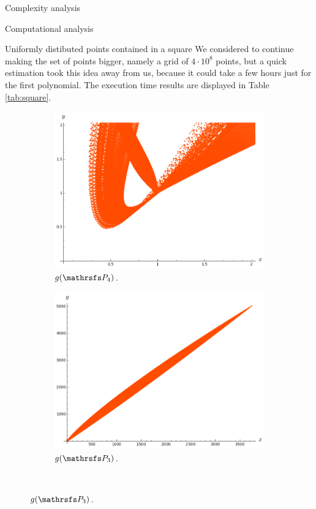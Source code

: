 \documentclass[11pt, a4paper, english, twoside, notitlepage, openright]{report}
\begin{document}
\begin{chapter}{Complexity analysis}
\begin{section}{Computational analysis}
\begin{subsection}{Uniformly distibuted points contained in a square}
We considered to continue making the set of points bigger, namely a grid of $4\cdot 10^8$ points, but a quick estimation took this idea away from us, because it could take a few hours just for the first polynomial. The execution time results are displayed in Table \ref{tab:square}.

\begin{figure}[ht!]
\hspace{0.1cm}
\begin{subfigure}{.49\linewidth}\centering
\includegraphics[width=1\textwidth]{plots/ch5_08_P4prime.png}
\vspace{-0.4cm}\caption{$g(\PP_4)$.\label{fig:gP4}}
\end{subfigure}
\begin{subfigure}{.49\linewidth}\centering
\includegraphics[width=1\textwidth]{plots/ch5_04_P3.png}
\vspace{-0.4cm}\caption{$g(\PP_3)$.\label{fig:gP3}}
\end{subfigure}\\[1ex]
\vspace{-0.2cm}


\end{figure}
\end{subsection}
\end{section}
\end{chapter}
\end{document}
